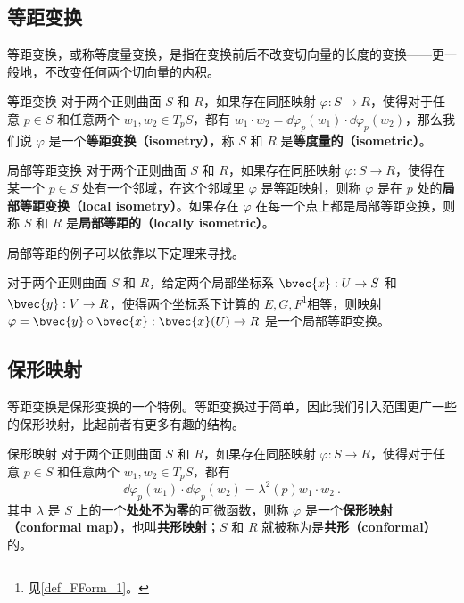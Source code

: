 
\subsection{等距变换}
等距变换，或称等度量变换，是指在变换前后不改变切向量的长度的变换——更一般地，不改变任何两个切向量的内积。

\begin{definition}{等距变换}
对于两个正则曲面 $S$ 和 $R$，如果存在同胚映射 $\varphi:S\to R$，使得对于任意 $p\in S$ 和任意两个 $w_1, w_2\in T_pS$，都有 $w_1\cdot w_2=\dd\varphi_p(w_1)\cdot\dd\varphi_p(w_2)$，那么我们说 $\varphi$ 是一个\textbf{等距变换（isometry）}，称 $S$ 和 $R$ 是\textbf{等度量的（isometric）}。
\end{definition}

\begin{definition}{局部等距变换}
对于两个正则曲面 $S$ 和 $R$，如果存在同胚映射 $\varphi:S\to R$，使得在某一个 $p\in S$ 处有一个邻域，在这个邻域里 $\varphi$ 是等距映射，则称 $\varphi$ 是在 $p$ 处的\textbf{局部等距变换（local isometry）}。如果存在 $\varphi$ 在每一个点上都是局部等距变换，则称 $S$ 和 $R$ 是\textbf{局部等距的（locally isometric）}。
\end{definition}

局部等距的例子可以依靠以下定理来寻找。

\begin{theorem}{}
对于两个正则曲面 $S$ 和 $R$，给定两个局部坐标系 $\bvec{x}:U\to S$ 和 $\bvec{y}:V\to R$，使得两个坐标系下计算的 $E, G, F$\footnote{见\autoref{def_FForm_1}。}相等，则映射 $\varphi=\bvec{y}\circ\bvec{x}:\bvec{x}(U)\to R$ 是一个局部等距变换。
\end{theorem}

\subsection{保形映射}

等距变换是保形变换的一个特例。等距变换过于简单，因此我们引入范围更广一些的保形映射，比起前者有更多有趣的结构。

\begin{definition}{保形映射}
对于两个正则曲面 $S$ 和 $R$，如果存在同胚映射 $\varphi:S\to R$，使得对于任意 $p\in S$ 和任意两个 $w_1, w_2\in T_pS$，都有
\begin{equation}
\dd\varphi_p(w_1)\cdot\dd\varphi_p(w_2)=\lambda^2(p)w_1\cdot w_2~.
\end{equation}
其中 $\lambda$ 是 $S$ 上的一个\textbf{处处不为零}的可微函数，则称 $\varphi$ 是一个\textbf{保形映射（conformal map）}，也叫\textbf{共形映射}；$S$ 和 $R$ 就被称为是\textbf{共形（conformal）}的。
\end{definition}

